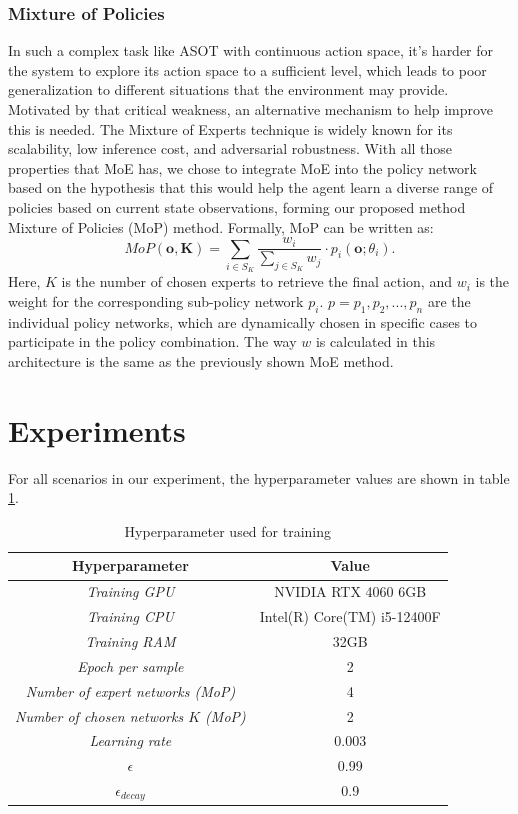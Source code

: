 \documentclass[sigconf]{aamas}
\begin{document}
\subsubsection{Mixture of Policies} \label{sec:MoP}
In such a complex task like ASOT with continuous action space, it's harder for the system to explore its action space to a sufficient level, which leads to poor generalization to different situations that the environment may provide. Motivated by that critical weakness, an alternative mechanism to help improve this is needed. The Mixture of Experts technique is widely known for its scalability, low inference cost, and adversarial robustness. With all those properties that MoE has, we chose to integrate MoE into the policy network based on the hypothesis that this would help the agent learn a diverse range of policies based on current state observations, forming our proposed method Mixture of Policies (MoP) method.  Formally, MoP can be written as:
\begin{equation}
MoP(\mathbf{o, K}) = \sum_{i \in S_K} \frac{w_i}{\sum_{j \in S_K} w_j} \cdot p_i(\mathbf{o}; \theta_i).
\end{equation}
Here, \(K\) is the number of chosen experts to retrieve the final action, and \(w_i\) is the weight for the corresponding sub-policy network \(p_i\). \(p = {p_1, p_2, ..., p_n}\) are the individual policy networks, which are dynamically chosen in specific cases to participate in the policy combination. The way \(w\) is calculated in this architecture is the same as the previously shown MoE method. 
 
\section{Experiments}
For all scenarios in our experiment, the hyperparameter values are shown in table \ref{tab:hyperparameter}.
\begin{table}[h!]
    \centering
    \begin{tabular}{|c|c|}
        \hline
        \textbf{Hyperparameter} & \textbf{Value} \\
        \hline
        \textit{Training GPU} & NVIDIA RTX 4060 6GB \\
        \hline
        \textit{Training CPU} & Intel(R) Core(TM) i5-12400F\\        
        \hline
        \textit{Training RAM} & 32GB\\        
        \hline
        \textit{Epoch per sample} & 2\\
        \hline
        \textit{Number of expert networks (MoP)} & 4\\
        \hline
        \textit{Number of chosen networks \(K\) (MoP)} & 2\\
        \hline
        \textit{Learning rate} & 0.003\\
        \hline
        \textit{\(\epsilon\)} & 0.99\\
        \hline
        \textit{\(\epsilon_{decay}\)} & 0.9\\
        \hline
    \end{tabular}
    \caption{Hyperparameter used for training}
    \label{tab:hyperparameter}
\end{table}
\end{document}
